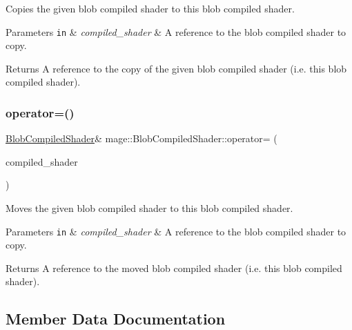 Copies the given blob compiled shader to this blob compiled shader.


\begin{DoxyParams}[1]{Parameters}
\mbox{\tt in}  & {\em compiled\+\_\+shader} & A reference to the blob compiled shader to copy. \\
\hline
\end{DoxyParams}
\begin{DoxyReturn}{Returns}
A reference to the copy of the given blob compiled shader (i.\+e. this blob compiled shader). 
\end{DoxyReturn}
\hypertarget{structmage_1_1_blob_compiled_shader_ae0ee5b9e147511cd3e74a5c89300c55d}{}\label{structmage_1_1_blob_compiled_shader_ae0ee5b9e147511cd3e74a5c89300c55d} 
\subsubsection{\texorpdfstring{operator=()}{operator=()}\hspace{0.1cm}{\footnotesize\ttfamily [2/2]}}
{\footnotesize\ttfamily \hyperlink{structmage_1_1_blob_compiled_shader}{Blob\+Compiled\+Shader}\& mage\+::\+Blob\+Compiled\+Shader\+::operator= (\begin{DoxyParamCaption}\item[{\hyperlink{structmage_1_1_blob_compiled_shader}{Blob\+Compiled\+Shader} \&\&}]{compiled\+\_\+shader }\end{DoxyParamCaption})\hspace{0.3cm}{\ttfamily [delete]}}

Moves the given blob compiled shader to this blob compiled shader.


\begin{DoxyParams}[1]{Parameters}
\mbox{\tt in}  & {\em compiled\+\_\+shader} & A reference to the blob compiled shader to copy. \\
\hline
\end{DoxyParams}
\begin{DoxyReturn}{Returns}
A reference to the moved blob compiled shader (i.\+e. this blob compiled shader). 
\end{DoxyReturn}


\subsection{Member Data Documentation}
\hypertarget{structmage_1_1_blob_compiled_shader_a1a6959678592e3456ac8cb810dbdf648}{}\label{structmage_1_1_blob_compiled_shader_a1a6959678592e3456ac8cb810dbdf648} 
